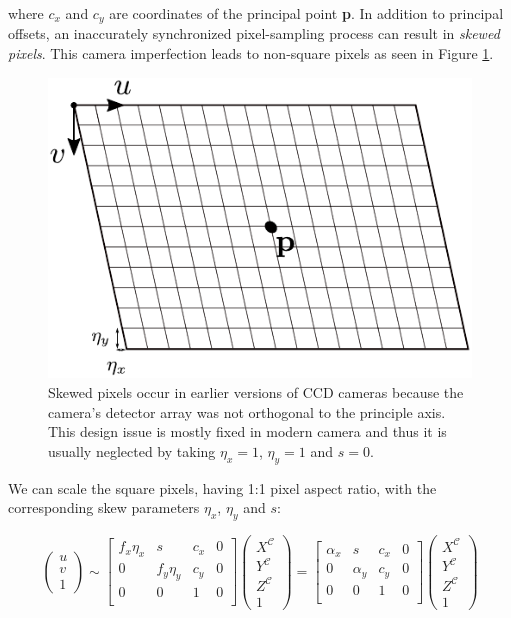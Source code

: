 \documentclass[12pt]{report}
\numberwithin{figure}{section}
\begin{document}
where $c_x$ and $c_y$ are coordinates of the principal point \textbf{p}.
In addition to principal offsets, an inaccurately synchronized pixel-sampling 
process can result in \textit{skewed pixels}. This camera imperfection leads 
to non-square pixels as seen in Figure \ref{fig:skewed}.

\begin{figure}[H]
	\centering
  \includegraphics[width=0.4\linewidth,natwidth=640,natheight=640]
  {fig/drawings/pinhole_skew.pdf}
  \caption[Skewed Pixels]{Skewed pixels occur in earlier versions of CCD 
  cameras because the camera's detector array was not orthogonal to the 
  principle axis. This design issue is mostly fixed in modern camera and thus 
  it is usually neglected by taking $\eta_x=1$, $\eta_y=1$ and $s=0$.}
	\label{fig:skewed}
\end{figure}

We can scale the square pixels, having 1:1 pixel aspect ratio, with the 
corresponding skew parameters $\eta_x$, $\eta_y$ and $s$:

\begin{equation} \label{eq:proj_func_w_square_pix_skew}
  \begin{pmatrix}
    u\\
    v\\
    1
  \end{pmatrix}
  \sim
  \begin{bmatrix}
    f_x\eta_x & s & c_x & 0\\
    0 & f_y\eta_y & c_y & 0\\
    0 & 0 & 1 & 0\\
  \end{bmatrix}
  \begin{pmatrix}
    X^{\mathcal{C}}\\
    Y^{\mathcal{C}}\\
    Z^{\mathcal{C}}\\
    1
  \end{pmatrix}
  =
  \begin{bmatrix}
    \alpha_x & s & c_x & 0\\
    0 & \alpha_y & c_y & 0\\
    0 & 0 & 1 & 0\\
  \end{bmatrix}
  \begin{pmatrix}
    X^{\mathcal{C}}\\
    Y^{\mathcal{C}}\\
    Z^{\mathcal{C}}\\
    1
  \end{pmatrix}
\end{equation} 
\end{document}
